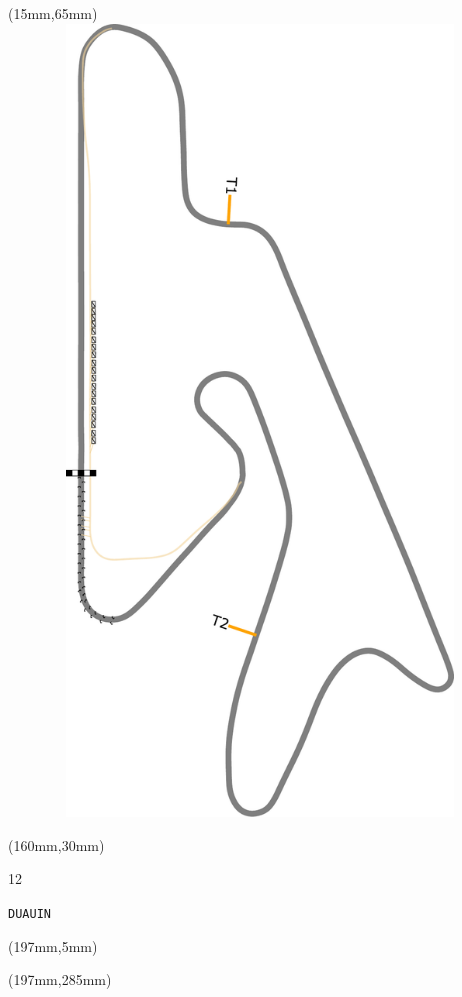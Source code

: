 \begin{textblock*}{185mm}(15mm,65mm)%
\centering
\mbox{\includegraphics[width=185mm,height=210mm,keepaspectratio]{PT/DUAUIN.pdf}}
\end{textblock*}
\begin{textblock*}{40mm}(160mm,30mm)%
\Large
\par{} 
\par12 
\par\hfill\tiny\tt DUAUIN\\
\end{textblock*}
\begin{textblock*}{20mm}(197mm,5mm)%
\fbox{\thepage}
\label{DUAUIN}
\end{textblock*}
\begin{textblock*}{20mm}(197mm,285mm)%
\fbox{\thepage}
\end{textblock*}

